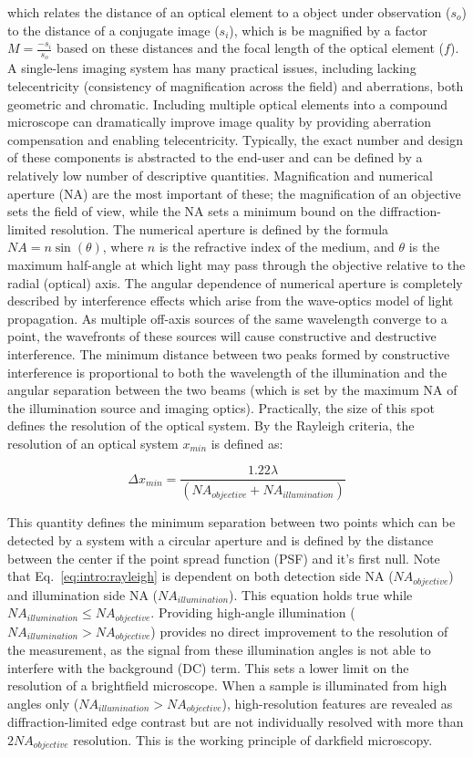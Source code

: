 \noindent which relates the distance of an optical element to a object under observation ($s_o$) to the distance of a conjugate image ($s_i$), which is be magnified by a factor $M = \frac{-s_i}{s_o}$ based on these distances and the focal length of the optical element ($f$). A single-lens imaging system has many practical issues, including lacking telecentricity (consistency of magnification across the field) and aberrations, both geometric and chromatic. Including multiple optical elements into a compound microscope can dramatically improve image quality by providing aberration compensation and enabling telecentricity. Typically, the exact number and design of these components is abstracted to the end-user and can be defined by a relatively low number of descriptive quantities. Magnification and numerical aperture (NA) are the most important of these; the magnification of an objective sets the field of view, while the NA sets a minimum bound on the diffraction-limited resolution. The numerical aperture is defined by the formula $NA=n\sin (\theta)$, where $n$ is the refractive index of the medium, and $\theta$ is the maximum half-angle at which light may pass through the objective relative to the radial (optical) axis. The angular dependence of numerical aperture is completely described by interference effects which arise from the wave-optics model of light propagation. As multiple off-axis sources of the same wavelength converge to a point, the wavefronts of these sources will cause constructive and destructive interference. The minimum distance between two peaks formed by constructive interference is proportional to both the wavelength of the illumination and the angular separation between the two beams (which is set by the maximum NA of the illumination source and imaging optics). Practically, the size of this spot defines the resolution of the optical system. By the Rayleigh criteria, the resolution of an optical system $x_{min}$ is defined as:

\begin{equation}\label{eq:intro:rayleigh}
\Delta x_{min}  = \frac{1.22 \lambda}{(NA_{objective} + NA_{illumination})}
\end{equation}

This quantity defines the minimum separation between two points which can be detected by a system with a circular aperture and is defined by the distance between the center if the point spread function (PSF) and it's first null. Note that Eq.~\ref{eq:intro:rayleigh} is dependent on both detection side NA ($NA_{objective}$) and illumination side NA ($NA_{illumination}$).
This equation holds true while $NA_{illumination} \leq NA_{objective}$. Providing high-angle illumination ($NA_{illumination} > NA_{objective}$) provides no direct improvement to the resolution of the measurement, as the signal from these illumination angles is not able to interfere with the background (DC) term. This sets a lower limit on the resolution of a brightfield microscope. When a sample is illuminated from high angles only ($NA_{illumination} > NA_{objective}$), high-resolution features are revealed as diffraction-limited edge contrast but are not individually resolved with more than $2NA_{objective}$ resolution. This is the working principle of darkfield microscopy.

